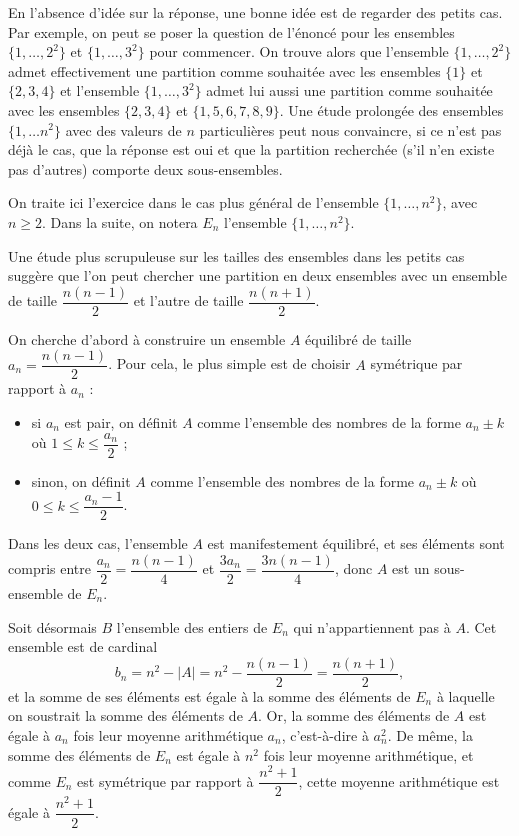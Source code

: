 En l'absence d'idée sur la réponse, une bonne idée est de regarder des petits cas. Par exemple, on peut se poser la question de l'énoncé pour les ensembles $\{1, \ldots ,2^2\}$ et $\{1,\ldots ,3^2\}$ pour commencer. On trouve alors que l'ensemble $\{1, \ldots , 2^2\}$ admet effectivement une partition comme souhaitée avec les ensembles $\{1\}$ et $\{2,3,4\}$ et l'ensemble $\{1,\ldots , 3^2\}$ admet lui aussi une partition comme souhaitée avec les ensembles $\{2,3,4\}$ et $\{1,5,6,7,8,9\}$. Une étude prolongée des ensembles $\{1,\ldots n^2\}$ avec des valeurs de $n$ particulières peut nous convaincre, si ce n'est pas déjà le cas, que la réponse est oui et que la partition recherchée (s'il n'en existe pas d'autres) comporte deux sous-ensembles.

\medskip

On traite ici l'exercice dans le cas plus général de l'ensemble $\{1,\ldots , n^2\}$, avec $n\ge 2$. Dans la suite, on notera $E_n$ l'ensemble $\{1,\ldots , n^2\}$.

\medskip

Une étude plus scrupuleuse sur les tailles des ensembles dans les petits cas suggère que l'on peut chercher une partition en deux ensembles avec un ensemble de taille $\dfrac{n(n-1)}{2}$ et l'autre de taille $\dfrac{n(n+1)}{2}$.

On cherche d'abord à construire un ensemble $A$ équilibré
de taille $a_n = \dfrac{n(n-1)}{2}$.
Pour cela, le plus simple est de choisir $A$ symétrique par rapport à $a_n$ :
\begin{itemize}
\item si $a_n$ est pair, on définit $A$ comme l'ensemble
des nombres de la forme $a_n \pm k$ où $1 \le k \le \dfrac{a_n}{2}$ ;
\item sinon, on définit $A$ comme l'ensemble
des nombres de la forme $a_n \pm k$ où $0 \le k \le \dfrac{a_n-1}{2}$.
\end{itemize}

Dans les deux cas, l'ensemble $A$ est manifestement équilibré,
et ses éléments sont compris entre $\dfrac{a_n}{2} = \dfrac{n(n-1)}{4}$ et
$\dfrac{3a_n}{2} = \dfrac{3n(n-1)}{4}$, donc $A$ est un
sous-ensemble de $E_n$.

\medskip

Soit désormais $B$ l'ensemble des entiers de $E_n$ qui n'appartiennent pas à $A$. Cet ensemble est de cardinal
$$b_n=n^2-|A| = n^2-\frac{n(n-1)}{2} = \frac{n(n+1)}{2},$$
et la somme de ses éléments est égale à la somme des éléments
de $E_n$ à laquelle on soustrait la somme des éléments de $A$.
Or, la somme des éléments de $A$ est égale à $a_n$ fois leur
moyenne arithmétique $a_n$, c'est-à-dire à $a_n^2$.
De même, la somme des éléments de $E_n$ est égale à $n^2$ fois
leur moyenne arithmétique, et comme $E_n$ est symétrique
par rapport à $\dfrac{n^2+1}{2}$, cette moyenne arithmétique
est égale à $\dfrac{n^2+1}{2}$.

